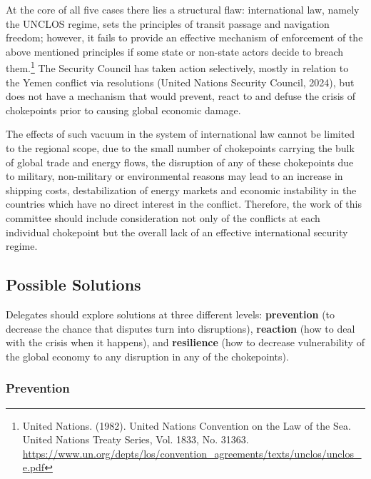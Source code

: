 At the core of all five cases there lies a structural flaw: international law, namely the UNCLOS regime, sets the principles of transit passage and navigation freedom; however, it fails to provide an effective mechanism of enforcement of the above mentioned principles if some state or non-state actors decide to breach them.\footnote{United Nations. (1982). United Nations Convention on the Law of the Sea. United Nations Treaty Series, Vol. 1833, No. 31363. \url{https://www.un.org/depts/los/convention_agreements/texts/unclos/unclos_e.pdf}} The Security Council has taken action selectively, mostly in relation to the Yemen conflict via resolutions (United Nations Security Council, 2024), but does not have a mechanism that would prevent, react to and defuse the crisis of chokepoints prior to causing global economic damage.

The effects of such vacuum in the system of international law cannot be limited to the regional scope, due to the small number of chokepoints carrying the bulk of global trade and energy flows, the disruption of any of these chokepoints due to military, non-military or environmental reasons may lead to an increase in shipping costs, destabilization of energy markets and economic instability in the countries which have no direct interest in the conflict. Therefore, the work of this committee should include consideration not only of the conflicts at each individual chokepoint but the overall lack of an effective international security regime.

\subsection{Possible Solutions}

Delegates should explore solutions at three different levels: \textbf{prevention} (to decrease the chance that disputes turn into disruptions), \textbf{reaction} (how to deal with the crisis when it happens), and \textbf{resilience} (how to decrease vulnerability of the global economy to any disruption in any of the chokepoints).

\subsubsection{Prevention}

